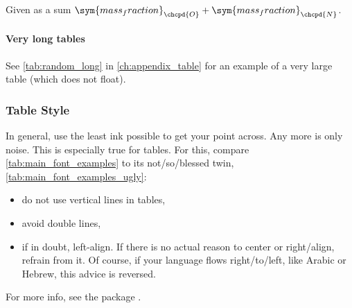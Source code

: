 \begin{landscape}
\begin{table}[tbp]
{            Given as a sum \(\sym{mass_fraction}_{\chcpd{O}} + \sym{mass_fraction}_{\chcpd{N}}\).%
        }
    
    \end{table}
\end{landscape}

\paragraph{Very long tables}

See \cref{tab:random_long} in \cref{ch:appendix_table} for an example of a very large table (which does not float).

\subsubsection{Table Style}

In general, use the least ink possible to get your point across.
Any more is only noise.
This is especially true for tables.
For this, compare \cref{tab:main_font_examples} to its not\-/so\-/blessed
twin, \cref{tab:main_font_examples_ugly}:
\begin{itemize}
    \item do not use vertical lines in tables,
    \item avoid double lines,
    \item if in doubt, left-align.
          If there is no actual reason to center or right\-/align, refrain from it.
          Of course, if your language flows right\-/to\-/left, like Arabic or Hebrew,
          this advice is reversed.
\end{itemize}
For more info, see the package .

